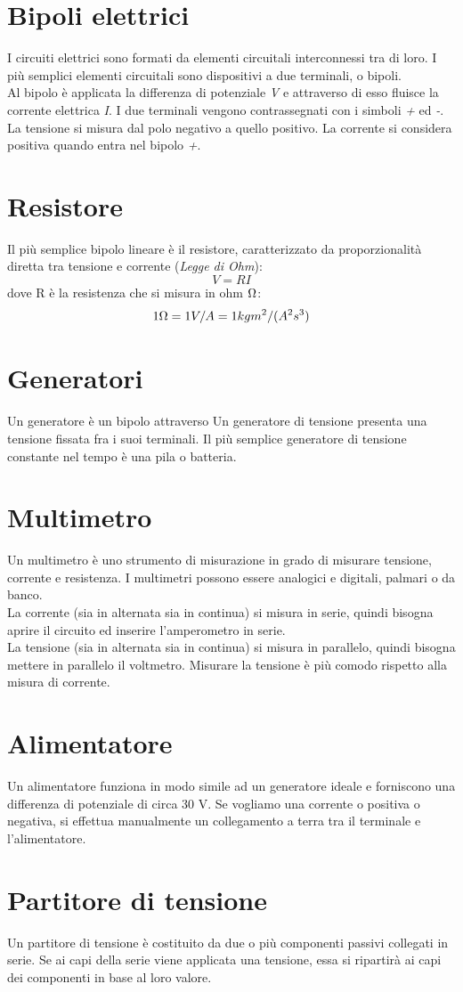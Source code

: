 \documentclass{article}
\begin{document}
	\section{Bipoli elettrici}
		I circuiti elettrici sono formati da elementi circuitali interconnessi tra di loro. I più semplici elementi circuitali sono dispositivi a due terminali, o bipoli. \\
		Al bipolo è applicata la differenza di potenziale \emph{V} e attraverso di esso fluisce la corrente elettrica \emph{I}. I due terminali vengono contrassegnati con i simboli \emph{+} ed \emph{-}. 
		La tensione si misura dal polo negativo a quello positivo. La corrente si considera positiva quando entra nel bipolo \emph{+}. 
		
	\section{Resistore}
		Il più semplice bipolo lineare è il resistore, caratterizzato da proporzionalità diretta tra tensione e corrente (\emph{Legge di Ohm}): \[ V = R I \] dove R è la resistenza che si misura in ohm $\ohm$: \[ 1 \ohm = 1 V/A = 1 kg m^2 / (A^2 s^3) \]
		
	\section{Generatori}	
		Un generatore è un bipolo attraverso 
		Un generatore di tensione presenta una tensione fissata fra i suoi terminali. Il più semplice generatore di tensione constante nel tempo è una pila o batteria. 
		
	\section{Multimetro}
		Un multimetro è uno strumento di misurazione in grado di misurare tensione, corrente e resistenza. I multimetri possono essere analogici e digitali, palmari o da banco. \\
		La corrente (sia in alternata sia in continua) si misura in serie, quindi bisogna aprire il circuito ed inserire l'amperometro in serie. \\
		La tensione (sia in alternata sia in continua) si misura in parallelo, quindi bisogna mettere in parallelo il voltmetro. Misurare la tensione è più comodo rispetto alla misura di corrente. \\
		
	\section{Alimentatore}
		Un alimentatore funziona in modo simile ad un generatore ideale e forniscono una differenza di potenziale di circa 30 V. Se vogliamo una corrente o positiva o negativa, si effettua manualmente un collegamento a terra tra il terminale e l'alimentatore. 
		
	\section{Partitore di tensione}
		Un partitore di tensione è costituito da due o più componenti passivi collegati in serie. Se ai capi della serie viene applicata una tensione, essa si ripartirà ai capi dei componenti in base al loro valore. 
		
\end{document}
